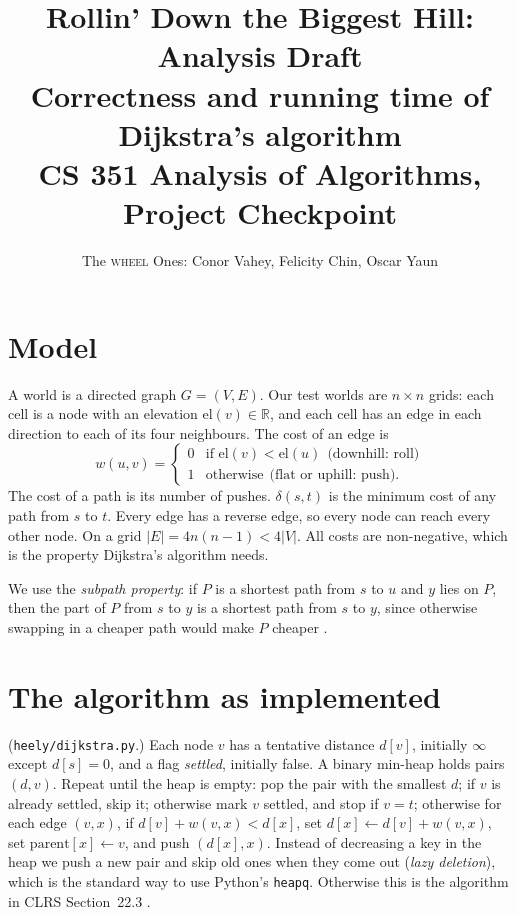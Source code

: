 \documentclass[11pt]{article}
\title{\vspace{-2.2em}\textbf{Rollin' Down the Biggest Hill: Analysis Draft}\\
\large Correctness and running time of Dijkstra's algorithm\\
\normalsize CS 351 Analysis of Algorithms, Project Checkpoint}
\author{The \textsc{wheel} Ones: Conor Vahey, Felicity Chin, Oscar Yaun}
\date{\vspace{-1.5em}}
\newcommand{\dist}{\delta}
\newcommand{\R}{\mathbb{R}}
\begin{document}
\maketitle

\section{Model}

A world is a directed graph $G=(V,E)$. Our test worlds are $n\times n$ grids: each cell is a node with an elevation $\mathrm{el}(v)\in\R$, and each cell has an edge in each direction to each of its four neighbours. The cost of an edge is
\[
w(u,v)=\begin{cases}0 & \text{if } \mathrm{el}(v)<\mathrm{el}(u)\ \ \text{(downhill: roll)}\\ 1 & \text{otherwise}\ \ \text{(flat or uphill: push)}.\end{cases}
\]
The cost of a path is its number of pushes. $\dist(s,t)$ is the minimum cost of any path from $s$ to $t$. Every edge has a reverse edge, so every node can reach every other node. On a grid $|E| = 4n(n-1) < 4|V|$. All costs are non-negative, which is the property Dijkstra's algorithm needs.

We use the \emph{subpath property}: if $P$ is a shortest path from $s$ to $u$ and $y$ lies on $P$, then the part of $P$ from $s$ to $y$ is a shortest path from $s$ to $y$, since otherwise swapping in a cheaper path would make $P$ cheaper \cite[Lemma~22.1]{clrs}.

\section{The algorithm as implemented}

(\texttt{heely/dijkstra.py}.) Each node $v$ has a tentative distance $d[v]$, initially $\infty$ except $d[s]=0$, and a flag \emph{settled}, initially false. A binary min-heap holds pairs $(d, v)$. Repeat until the heap is empty: pop the pair with the smallest $d$; if $v$ is already settled, skip it; otherwise mark $v$ settled, and stop if $v=t$; otherwise for each edge $(v,x)$, if $d[v]+w(v,x)<d[x]$, set $d[x]\gets d[v]+w(v,x)$, set $\mathrm{parent}[x]\gets v$, and push $(d[x],x)$. Instead of decreasing a key in the heap we push a new pair and skip old ones when they come out (\emph{lazy deletion}), which is the standard way to use Python's \texttt{heapq}. Otherwise this is the algorithm in CLRS Section~22.3 \cite{clrs}.
\end{document}
